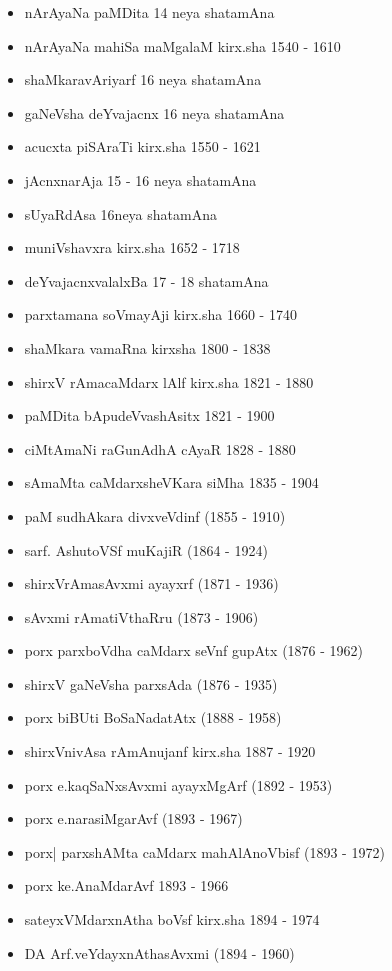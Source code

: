 {\begin{itemize}
\item nArAyaNa paMDita {\rm 14} neya shatamAna
\item nArAyaNa mahiSa maMgalaM kirx.sha {\rm 1540 - 1610}
\item shaMkaravAriyarf {\rm 16} neya shatamAna
\item gaNeVsha deYvajacnx {\rm 16} neya shatamAna
\item acucxta piSAraTi kirx.sha {\rm 1550 - 1621}
\item jAcnxnarAja {\rm 15 - 16} neya shatamAna
\item sUyaRdAsa {\rm 16}neya shatamAna
\item muniVshavxra kirx.sha {\rm 1652 - 1718}
\item deYvajacnxvalalxBa {\rm 17 - 18} shatamAna
\item parxtamana soVmayAji kirx.sha {\rm 1660 - 1740}
\item shaMkara vamaRna kirxsha {\rm 1800 - 1838}
\item shirxV rAmacaMdarx lAlf kirx.sha {\rm 1821 - 1880}
\item paMDita bApudeVvashAsitx {\rm 1821 - 1900}
\item ciMtAmaNi raGunAdhA cAyaR {\rm 1828 - 1880}
\item sAmaMta caMdarxsheVKara siMha {\rm 1835 - 1904}
\item paM sudhAkara divxveVdinf {\rm (1855 - 1910)}
\item sarf. AshutoVSf muKajiR {\rm (1864 - 1924)}
\item shirxVrAmasAvxmi ayayxrf {\rm (1871 - 1936)}
\item sAvxmi rAmatiVthaRru {\rm (1873 - 1906)}
\item porx parxboVdha caMdarx seVnf gupAtx {\rm (1876 - 1962)}
\item shirxV gaNeVsha parxsAda {\rm (1876 - 1935)}
\item porx biBUti BoSaNadatAtx {\rm (1888 - 1958)}
\item shirxVnivAsa rAmAnujanf kirx.sha {\rm 1887 - 1920}
\item porx e.kaqSaNxsAvxmi ayayxMgArf {\rm (1892 - 1953)}
\item porx e.narasiMgarAvf {\rm (1893 - 1967)}
\item porx| parxshAMta caMdarx mahAlAnoVbisf {\rm (1893 - 1972)}
\item porx ke.AnaMdarAvf {\rm 1893 - 1966}
\item sateyxVMdarxnAtha boVsf kirx.sha {\rm 1894 - 1974}
\item DA Arf.veYdayxnAthasAvxmi {\rm (1894 - 1960)}

\end{itemize}}
